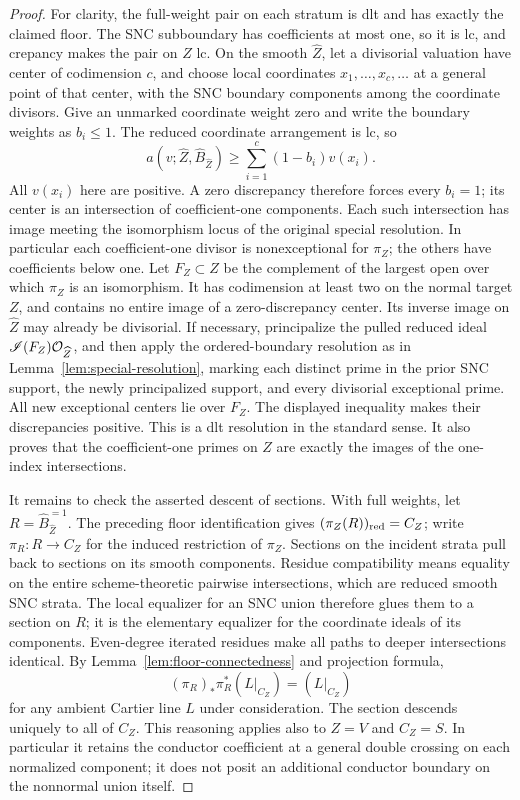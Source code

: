 \begin{proof}
For clarity, the full-weight pair on each stratum is dlt and has exactly
the claimed floor.  The SNC subboundary has coefficients at most one, so
it is lc, and crepancy makes the pair on \(Z\) lc.  On the smooth
\(\widehat Z\), let a divisorial
valuation have center of codimension \(c\), and choose local coordinates
\(x_1,\ldots,x_c,\ldots\) at a general point of that center, with the
SNC boundary components among the coordinate divisors.  Give an unmarked
coordinate weight zero and write the boundary weights as \(b_i\leq1\).
The reduced coordinate arrangement is lc, so
\[
 a(v;\widehat Z,\widehat B_{\widehat Z})
 \geq\sum_{i=1}^c(1-b_i)v(x_i).
\]
All \(v(x_i)\) here are positive.  A zero discrepancy therefore forces
every \(b_i=1\); its center is an intersection of coefficient-one
components.  Each such intersection has image meeting the isomorphism
locus of the original special resolution.  In particular each
coefficient-one divisor is nonexceptional for \(\pi_Z\); the others have
coefficients below one.  Let \(F_Z\subset Z\) be the complement of the
largest open over which \(\pi_Z\) is an isomorphism.  It has codimension
at least two on the normal target \(Z\), and contains no entire image of
a zero-discrepancy center.  Its inverse image on \(\widehat Z\) may already
be divisorial.  If necessary, principalize the pulled reduced ideal
\(\mathscr I(F_Z)\mathcal O_{\widehat Z}\), and then apply the ordered-boundary
resolution as in Lemma~\ref{lem:special-resolution}, marking each distinct
prime in the prior SNC support, the newly principalized support, and every
divisorial exceptional prime.  All new exceptional centers lie over
\(F_Z\).  The displayed inequality makes their discrepancies positive.
This is a dlt resolution in the
standard sense.  It also proves that the coefficient-one primes on \(Z\)
are exactly the images of the one-index intersections.

It remains to check the asserted descent of sections.  With full weights,
let \(R=\widehat B_{\widehat Z}^{=1}\).  The preceding floor identification
gives \((\pi_Z(R))_{\mathrm{red}}=C_Z\); write \(\pi_R:R\to C_Z\) for the induced
restriction of \(\pi_Z\).  Sections on the incident strata
pull back to sections on its smooth components.  Residue compatibility
means equality on the entire scheme-theoretic pairwise intersections,
which are reduced smooth SNC strata.  The local equalizer for an SNC union
therefore glues them to a section on \(R\); it is the elementary equalizer
for the coordinate ideals of its components.  Even-degree iterated
residues make all paths to deeper intersections identical.  By
Lemma~\ref{lem:floor-connectedness} and projection formula,
\[
 (\pi_R)_*\pi_R^*(L|_{C_Z})=(L|_{C_Z})
\]
for any ambient Cartier line \(L\) under consideration.  The section
descends uniquely to all of \(C_Z\).  This reasoning applies also to
\(Z=V\) and \(C_Z=S\).  In particular it retains the conductor
coefficient at a general double crossing on each normalized component;
it does not posit an additional conductor boundary on the nonnormal
union itself.
\end{proof}

